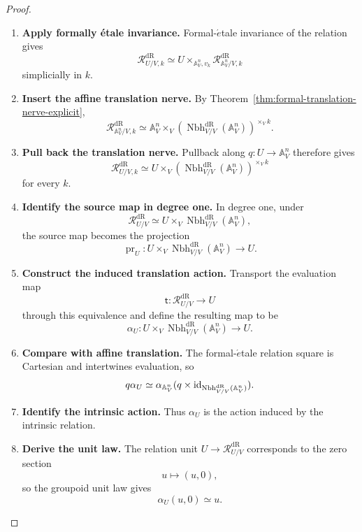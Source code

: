 \begin{proof}
\leavevmode
\begin{enumerate}[label=\textup{(\arabic*)}]
    \item \textbf{Apply formally étale invariance.}
Formal-\(\acute{e}\)tale invariance of the relation gives
\[
  \mathcal R^{\mathrm{dR}}_{U/V,k}
  \simeq
  U\times_{\mathbb A^n_V,v_k}\mathcal R^{\mathrm{dR}}_{\mathbb A^n_V/V,k}
\]
simplicially in \(k\).

    \item \textbf{Insert the affine translation nerve.}
By
Theorem~\ref{thm:formal-translation-nerve-explicit},
\[
  \mathcal R^{\mathrm{dR}}_{\mathbb A^n_V/V,k}
  \simeq
  \mathbb A^n_V\times_V(\operatorname{Nbh}^{\mathrm{dR}}_{V/V}(\mathbb A^n_V))^{\times_V k}.
\]

    \item \textbf{Pull back the translation nerve.}
Pullback along \(q:U\to\mathbb A^n_V\) therefore gives
\[
  \mathcal R^{\mathrm{dR}}_{U/V,k}
  \simeq
  U\times_V(\operatorname{Nbh}^{\mathrm{dR}}_{V/V}(\mathbb A^n_V))^{\times_V k}
\]
for every \(k\).

    \item \textbf{Identify the source map in degree one.}
In degree one, under
\[
  \mathcal R^{\mathrm{dR}}_{U/V}
  \simeq
  U\times_V\operatorname{Nbh}^{\mathrm{dR}}_{V/V}(\mathbb A^n_V),
\]
the source map becomes the projection
\[
  \operatorname{pr}_U:U\times_V\operatorname{Nbh}^{\mathrm{dR}}_{V/V}(\mathbb A^n_V)\to U.
\]

    \item \textbf{Construct the induced translation action.}
Transport the evaluation map
\[
  \mathsf t:\mathcal R^{\mathrm{dR}}_{U/V}\to U
\]
through this equivalence and define the resulting map to be
\[
  \alpha_U:
  U\times_V\operatorname{Nbh}^{\mathrm{dR}}_{V/V}(\mathbb A^n_V)\to U.
\]

    \item \textbf{Compare with affine translation.}
The formal-\(\acute{e}\)tale relation square is Cartesian and intertwines
evaluation, so
\[
  q\alpha_U
  \simeq
  \alpha_{\mathbb A^n_V}(q\times\operatorname{id}_{\operatorname{Nbh}^{\mathrm{dR}}_{V/V}(\mathbb A^n_V)}).
\]

    \item \textbf{Identify the intrinsic action.}
Thus \(\alpha_U\) is the action induced by the intrinsic relation.

    \item \textbf{Derive the unit law.}
The relation unit \(U\to \mathcal R^{\mathrm{dR}}_{U/V}\) corresponds to the zero section
\[
  u\longmapsto(u,0),
\]
so the groupoid unit law gives
\[
  \alpha_U(u,0)\simeq u.
\]


\end{enumerate}
\end{proof}
